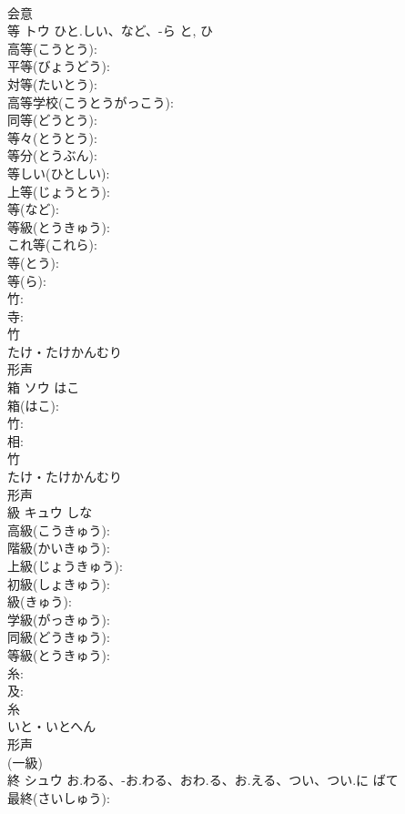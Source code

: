 \documentclass[8pt]{extreport}
\begin{document}
\begin{CJK}{UTF8}{min}
\\	会意 
\\	等	トウ	ひと.しい、など、-ら	と, ひ	
\\	高等(こうとう): 
\\	平等(びょうどう): 
\\	対等(たいとう): 
\\	高等学校(こうとうがっこう): 
\\	同等(どうとう): 
\\	等々(とうとう): 
\\	等分(とうぶん): 
\\	等しい(ひとしい): 
\\	上等(じょうとう): 
\\	等(など): 
\\	等級(とうきゅう): 
\\	これ等(これら): 
\\	等(とう): 
\\	等(ら): 
\\	竹: 
\\	寺: 
\\	竹	
\\	たけ・たけかんむり	
\\	形声 
\\	箱	ソウ	はこ		
\\	箱(はこ): 
\\	竹: 
\\	相: 
\\	竹	
\\	たけ・たけかんむり	
\\	形声 
\\	級	キュウ		しな	
\\	高級(こうきゅう): 
\\	階級(かいきゅう): 
\\	上級(じょうきゅう): 
\\	初級(しょきゅう): 
\\	級(きゅう): 
\\	学級(がっきゅう): 
\\	同級(どうきゅう): 
\\	等級(とうきゅう): 
\\	糸: 
\\	及: 
\\	糸	
\\	いと・いとへん	
\\	形声 
\\	(一級) 
\\	終	シュウ	お.わる、-お.わる、おわ.る、お.える、つい、つい.に	ばて	
\\	最終(さいしゅう): 

\end{CJK}
\end{document}

